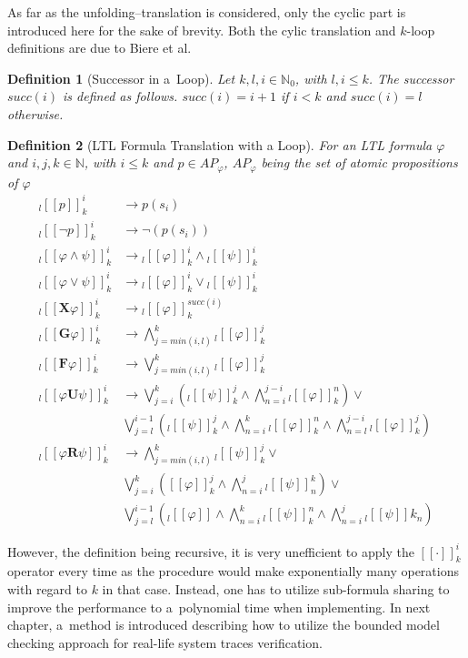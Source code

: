 \documentclass[12pt,twoside,draft]{fithesis}
\newcommand{\mNatural}{\mathbb{N}}
\newcommand{\bF}{\mathbf{F}}
\newcommand{\bG}{\mathbf{G}}
\newcommand{\bX}{\mathbf{X}}
\newcommand{\bU}{\mathbf{U}}
\newcommand{\bR}{\mathbf{R}}
\newtheorem{mydef}{Definition}
\begin{document}
As far as the unfolding--translation is considered, only the cyclic part
is introduced here for the sake of brevity.
Both the cylic translation and $k$-loop definitions are due to Biere
et al.
\begin{mydef}[Successor in a~Loop]
Let $k,l,i\in\mNatural_0$, with $l,i \leq k$. The successor $succ(i)$ is
defined as follows. $succ(i)=i+1$ if $i<k$ and $succ(i)=l$ otherwise.
\end{mydef}
\begin{mydef}[LTL Formula Translation with a Loop]
For an LTL formula $\varphi$ and $i,j,k\in\mNatural$, with $i\leq k$ and
$p\in {AP}_\varphi$, ${AP}_\varphi$ being the set of atomic propositions
of $\varphi$
\begin{align}
	{}_l[[p]]_k^i&\rightarrow p(s_i)\\
	{}_l[[\neg p]]_k^i&\rightarrow\neg(p(s_i))\\
	{}_l[[\varphi\wedge\psi]]_k^i&\rightarrow
		{}_l[[\varphi]]_k^i\wedge{}_l[[\psi]]_k^i\\
	{}_l[[\varphi\vee\psi]]_k^i&\rightarrow
		{}_l[[\varphi]]_k^i\vee{}_l[[\psi]]_k^i\\
	{}_l[[\bX\varphi]]_k^i&\rightarrow{}_l[[\varphi]]_k^{succ(i)}\\
	{}_l[[\bG\varphi]]_k^i&\rightarrow\bigwedge_{j=min(i,l)}^k
		{}_l[[\varphi]]_k^j\\
	{}_l[[\bF\varphi]]_k^i&\rightarrow\bigvee_{j=min(i,l)}^k
		{}_l[[\varphi]]_k^j\\
	{}_l[[\varphi\bU\psi]]_k^i&\rightarrow\bigvee_{j=i}^k\left(
		{}_l[[\psi]]_k^j\wedge\bigwedge_{n=i}^{j-i}{}_l[[\varphi]]_k^n
		\right)\vee\nonumber\\
		&\bigvee_{j=l}^{i-1}\left({}_l[[\psi]]_k^j\wedge\bigwedge_{n=i}^k
		{}_l[[\varphi]]_k^n\wedge\bigwedge_{n=l}^{j-i}
		{}_l[[\varphi]]_k^j\right)\\
	{}_l[[\varphi\bR\psi]]_k^i&\rightarrow\bigwedge_{j=min(i,l)}^k
		{}_l[[\psi]]_k^j\vee\nonumber\\
		&\bigvee_{j=i}^k\left([[\varphi]]_k^j\wedge\bigwedge_{n=i}^j
		{}_l[[\psi]]_n^k\right)\vee\nonumber\\
		&\bigvee_{j=l}^{i-1}\left({}_l[[\varphi]]\wedge\bigwedge_{n=i}^k
		{}_l[[\psi]]_k^n\wedge\bigwedge_{n=i}^j{}_l[[\psi]]k_n\right)
\end{align} 
\end{mydef}
However, the definition being recursive, it is very unefficient to
apply the $[[\cdot]]_k^i$ operator every time as the procedure would
make exponentially many operations with regard to $k$ in that case.
Instead, one has to utilize sub-formula sharing to improve the
performance to a~polynomial time when implementing\cite{biere}. In next
chapter, a~method is introduced describing how to utilize the bounded
model checking approach for real-life system traces verification.
\end{document}
